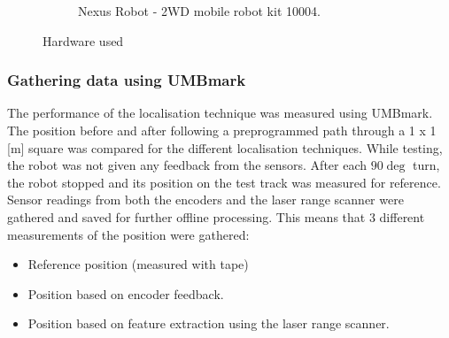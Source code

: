 \begin{figure}[ht]
\begin{subfigure}[t]{0.4\textwidth}
    \caption{Nexus Robot - 2WD mobile robot kit 10004.}
    \label{nexus_robot}
  \end{subfigure}
    \caption{Hardware used}
\end{figure}

\subsubsection{Gathering data using UMBmark}
The performance of the localisation technique was measured using UMBmark. 
The position before and after following a preprogrammed path through a 1 x 1 [m] square %
was compared for the different localisation techniques.
While testing, the robot was not given any feedback from the sensors.
After each $90 \deg$ turn, the robot stopped and its position on the test track was measured for reference.  
Sensor readings from both the encoders and the laser range scanner were gathered and saved for further offline processing. 
This means that 3 different measurements of the position were gathered: 
\begin{itemize}
	\item Reference position (measured with tape)
	\item Position based on encoder feedback. 
	\item Position based on feature extraction using the laser range scanner. 
\end{itemize}

